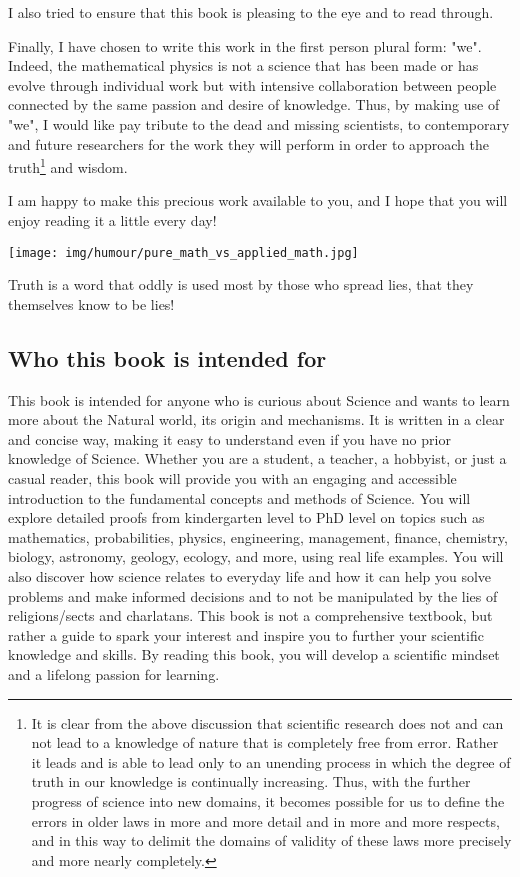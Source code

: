 	I also tried to ensure that this book is pleasing to the eye and to read through.
	
	Finally, I have chosen to write this work in the first person plural form: "we". Indeed, the mathematical physics is not a science that has been made or has evolve through individual work but with intensive collaboration between people connected by the same passion and desire of knowledge. Thus, by making use of "we", I would like pay tribute to the dead and missing scientists, to contemporary and future researchers for the work they will perform in order to approach the truth\footnote{It is clear from the above discussion that scientific research does not and can not lead to a knowledge of nature that is completely free from error. Rather it leads and is able to lead only to an unending process in which the degree of truth in our knowledge is continually increasing. Thus, with the further progress of science into new domains, it becomes possible for us to define the errors in older laws in more and more detail and in more and more respects, and in this way to delimit the domains of validity of these laws more precisely and more nearly completely.} and wisdom.
	
	I am happy to make this precious work available to you, and I hope that you will enjoy reading it a little every day!
	
	\begin{center}
	\texttt{[image: img/humour/pure\_math\_vs\_applied\_math.jpg]}
	\end{center}
	
	\begin{fquote}[?]Truth is a word that oddly is used most by those who spread lies, that they themselves know to be lies!
 	\end{fquote}
 	
 	\pagebreak
 	\subsection{Who this book is intended for}
 	This book is intended for anyone who is curious about Science and wants to learn more about the Natural world, its origin and mechanisms. It is written in a clear and concise way, making it easy to understand even if you have no prior knowledge of Science. Whether you are a student, a teacher, a hobbyist, or just a casual reader, this book will provide you with an engaging and accessible introduction to the fundamental concepts and methods of Science. You will explore detailed proofs from kindergarten level to PhD level on topics such as mathematics, probabilities, physics, engineering, management, finance, chemistry, biology, astronomy, geology, ecology, and more, using real life examples. You will also discover how science relates to everyday life and how it can help you solve problems and make informed decisions and to not be manipulated by the lies of religions/sects and charlatans. This book is not a comprehensive textbook, but rather a guide to spark your interest and inspire you to further your scientific knowledge and skills. By reading this book, you will develop a scientific mindset and a lifelong passion for learning.
 	
